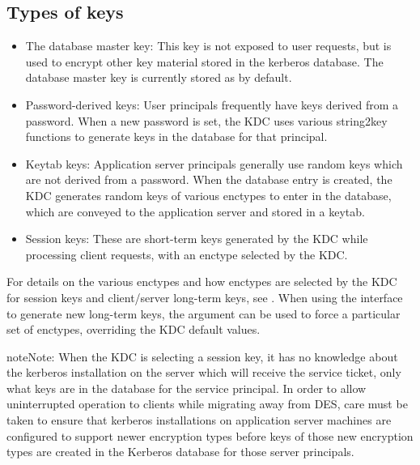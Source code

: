 \documentclass[letterpaper,10pt,english]{sphinxmanual}
\begin{document}
\subsection{Types of keys}
\label{\detokenize{admin/advanced/retiring-des:types-of-keys}}\begin{itemize}
\item {} 
The database master key:  This key is not exposed to user requests,
but is used to encrypt other key material stored in the kerberos
database.  The database master key is currently stored as 
by default.

\item {} 
Password-derived keys:  User principals frequently have keys
derived from a password.  When a new password is set, the KDC
uses various string2key functions to generate keys in the database
for that principal.

\item {} 
Keytab keys:  Application server principals generally use random
keys which are not derived from a password.  When the database
entry is created, the KDC generates random keys of various enctypes
to enter in the database, which are conveyed to the application server
and stored in a keytab.

\item {} 
Session keys:  These are short-term keys generated by the KDC while
processing client requests, with an enctype selected by the KDC.

\end{itemize}

For details on the various enctypes and how enctypes are selected by the KDC
for session keys and client/server long-term keys, see {\hyperref[\detokenize{admin/enctypes:enctypes}]{}}.
When using the {\hyperref[\detokenize{admin/admin_commands/kadmin_local:kadmin-1}]{}} interface to generate new long-term keys,
the  argument can be used to force a particular set of enctypes,
overriding the KDC default values.

\begin{sphinxadmonition}{note}{Note:}
When the KDC is selecting a session key, it has no knowledge about the
kerberos installation on the server which will receive the service ticket,
only what keys are in the database for the service principal.
In order to allow uninterrupted operation to
clients while migrating away from DES, care must be taken to ensure that
kerberos installations on application server machines are configured to
support newer encryption types before keys of those new encryption types
are created in the Kerberos database for those server principals.
\end{sphinxadmonition}
\end{document}

